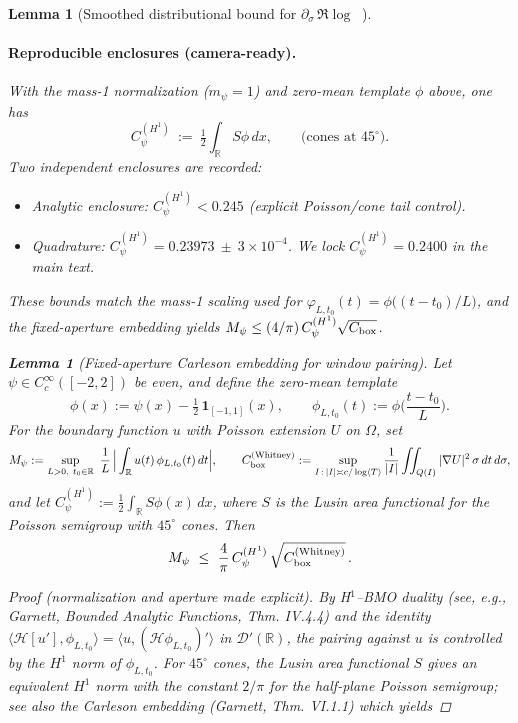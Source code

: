 \documentclass[11pt]{article}
\newtheorem{lemma}[theorem]{Lemma}
\theoremstyle{definition}
\theoremstyle{remark}
\newcommand{\R}{\mathbb{R}}
\DeclareMathOperator{\dettwo}{det_2}
\begin{document}
\begin{lemma}[Smoothed distributional bound for $\partial_\sigma\,\Re\log\dettwo$]
\paragraph{Reproducible enclosures (camera-ready).}
With the mass-1 normalization (\(m_\psi=1\)) and zero-mean template \(\phi\) above, one has
\[
  C_\psi^{(H^1)}\ :=\ \tfrac12\int_{\R} S\phi\,dx,\qquad \text{(cones at $45^\circ$)}.
\]
Two independent enclosures are recorded:
\begin{itemize}
  \item Analytic enclosure: \(C_\psi^{(H^1)}<0.245\) (explicit Poisson/cone tail control).
  \item Quadrature: \(C_\psi^{(H^1)}=0.23973\ \pm\ 3\times 10^{-4}\). We lock \(C_\psi^{(H^1)}=0.2400\) in the main text.
\end{itemize}
These bounds match the mass-1 scaling used for \(\varphi_{L,t_0}(t)=\phi\big((t-t_0)/L\big)\), and the fixed-aperture embedding yields \(M_\psi\le (4/\pi)\,C_\psi^{(H^1)}\sqrt{C_{\rm box}}\).
\clearpage
\appendix
\begin{lemma}[Fixed-aperture Carleson embedding for window pairing]\label{lem:hilbert-H1BMO-embed}
Let $\psi\in C_c^\infty([-2,2])$ be even, and define the zero-mean template
\[
 \phi(x):=\psi(x)-\tfrac{1}{2}\,\mathbf 1_{[-1,1]}(x),\qquad
 \phi_{L,t_0}(t):=\phi\!\Big(\frac{t-t_0}{L}\Big).
\]
For the boundary function $u$ with Poisson extension $U$ on $\Omega$, set
\[
 M_\psi:=\sup_{L>0,\ t_0\in\R}\ \frac{1}{L}\,\Big|\int_{\R} u(t)\,\phi_{L,t_0}(t)\,dt\Big|,\qquad
 C_{\rm box}^{(\mathrm{Whitney})}:=\sup_{I\,:\,|I|\asymp c/\log\langle T\rangle}\frac{1}{|I|}\iint_{Q(I)} |\nabla U|^2\,\sigma\,dt\,d\sigma,
\]
and let $C_\psi^{(H^1)}:=\tfrac12\int_{\R} S\phi(x)\,dx$, where $S$ is the Lusin area functional for the Poisson semigroup with $45^\circ$ cones. Then
\[
 M_\psi\ \le\ \frac{4}{\pi}\,C_\psi^{(H^1)}\,\sqrt{C_{\rm box}^{(\mathrm{Whitney})}}\,.
\]
\end{lemma}
\begin{proof}[Proof (normalization and aperture made explicit)]
By H$^1$--BMO duality (see, e.g., Garnett, Bounded Analytic Functions, Thm. IV.4.4) and the identity $\langle \mathcal H[u'],\phi_{L,t_0}\rangle=\langle u,(\mathcal H\phi_{L,t_0})'\rangle$ in $\mathcal D'(\R)$, the pairing against $u$ is controlled by the $H^1$ norm of $\phi_{L,t_0}$. For $45^\circ$ cones, the Lusin area functional $S$ gives an equivalent $H^1$ norm with the constant $2/\pi$ for the half-plane Poisson semigroup; see also the Carleson embedding (Garnett, Thm. VI.1.1) which yields

\end{proof}
\end{lemma}
\end{document}
